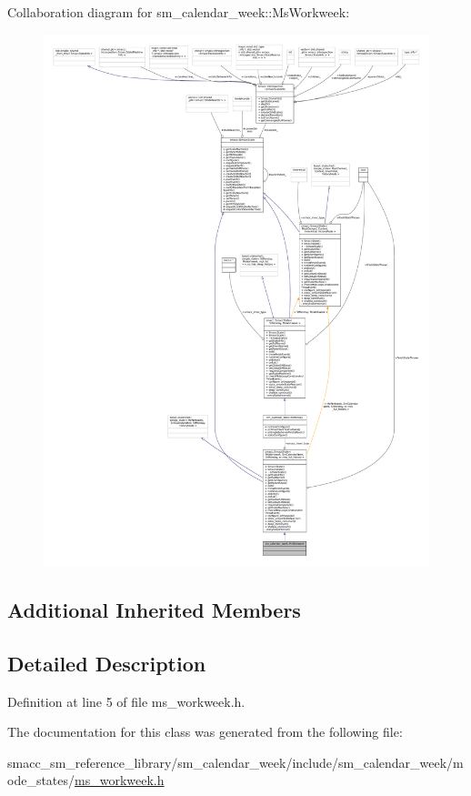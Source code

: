 Collaboration diagram for sm\+\_\+calendar\+\_\+week\+:\+:Ms\+Workweek\+:
\nopagebreak
\begin{figure}[H]
\begin{center}
\leavevmode
\includegraphics[width=350pt]{classsm__calendar__week_1_1MsWorkweek__coll__graph}
\end{center}
\end{figure}
\subsection*{Additional Inherited Members}


\subsection{Detailed Description}


Definition at line 5 of file ms\+\_\+workweek.\+h.



The documentation for this class was generated from the following file\+:\begin{DoxyCompactItemize}
\item 
smacc\+\_\+sm\+\_\+reference\+\_\+library/sm\+\_\+calendar\+\_\+week/include/sm\+\_\+calendar\+\_\+week/mode\+\_\+states/\hyperlink{ms__workweek_8h}{ms\+\_\+workweek.\+h}\end{DoxyCompactItemize}
